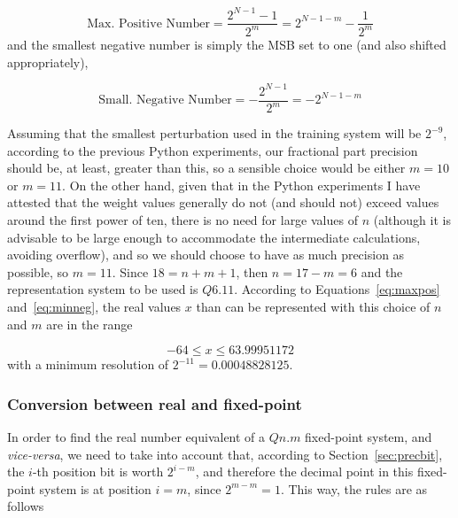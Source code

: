 \begin{equation}\label{eq:maxpos}
    \text{Max. Positive Number} = \frac{2^{N-1}-1}{2^m} = 2^{N-1-m} - \frac{1}{2^m}
\end{equation}
and the smallest negative number is simply the MSB set to one (and also shifted appropriately),

\begin{equation}\label{eq:minneg}
    \text{Small. Negative Number} = -\frac{2^{N-1}}{2^m} = -2^{N-1-m}
\end{equation}

Assuming that the smallest perturbation used in the training system will be $2^{-9}$, according to the previous Python experiments, our fractional part precision should be, at least, greater than this, so a sensible choice would be either $m=10$ or $m=11$. On the other hand, given that in the Python experiments I have attested that the weight values generally do not (and should not) exceed values around the first power of ten, there is no need for large values of $n$ (although it is advisable to be large enough to accommodate the intermediate calculations, avoiding overflow), and so we should choose to have as much precision as possible, so $m=11$. Since $18=n+m+1$, then $n = 17 - m = 6$ and the representation system to be used is $Q6.11$. According to Equations~\ref{eq:maxpos} and~\ref{eq:minneg}, the real values $x$ than can be represented with this choice of $n$ and $m$ are in the range 

\begin{equation}\label{eq:rangeQ611}
    -64 \leq x \leq 63.99951172
\end{equation}
with a minimum resolution of $2^{-11} = 0.00048828125$.

\subsubsection{Conversion between real and fixed-point}\label{sec:convrulesfp}
In order to find the real number equivalent of a $Qn.m$ fixed-point system, and \textit{vice-versa}, we need to take into account that, according to Section~\ref{sec:precbit}, the $i$-th position bit is worth $2^{i-m}$, and therefore the decimal point in this fixed-point system is at position $i=m$, since $2^{m-m} = 1$. This way, the rules are as follows

